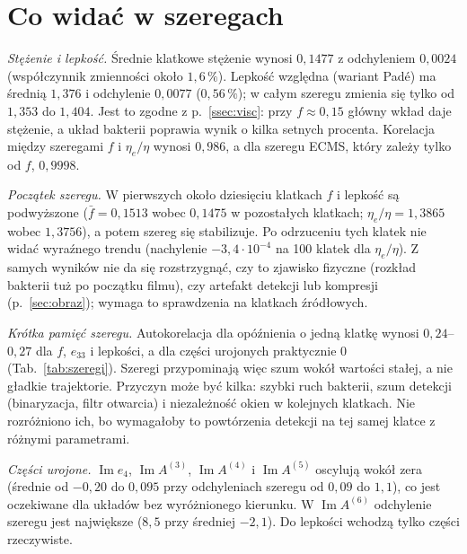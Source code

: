 \documentclass[12pt,a4paper,twoside,openright]{report}
\theoremstyle{definition}
\theoremstyle{remark}
\newcommand{\ziel}[1]{{\color{green!50!black}#1}}
\renewcommand{\Im}{\operatorname{Im}}
\begin{document}
\section{\ziel{Co widać w szeregach}}

\ziel{\emph{Stężenie i lepkość.} Średnie klatkowe stężenie wynosi $0{,}1477$ z odchyleniem $0{,}0024$ (współczynnik zmienności około $1{,}6\,\%$). Lepkość względna (wariant Padé) ma średnią $1{,}376$ i odchylenie $0{,}0077$ ($0{,}56\,\%$); w całym szeregu zmienia się tylko od $1{,}353$ do $1{,}404$. Jest to zgodne z p.~\ref{ssec:visc}: przy $f\approx0{,}15$ główny wkład daje stężenie, a układ bakterii poprawia wynik o kilka setnych procenta. Korelacja między szeregami $f$ i $\eta_e/\eta$ wynosi $0{,}986$, a dla szeregu ECMS, który zależy tylko od $f$, $0{,}9998$.}

\ziel{\emph{Początek szeregu.} W pierwszych około dziesięciu klatkach $f$ i lepkość są podwyższone ($\bar f=0{,}1513$ wobec $0{,}1475$ w pozostałych klatkach; $\eta_e/\eta=1{,}3865$ wobec $1{,}3756$), a potem szereg się stabilizuje. Po odrzuceniu tych klatek nie widać wyraźnego trendu (nachylenie $-3{,}4\cdot10^{-4}$ na 100 klatek dla $\eta_e/\eta$). Z samych wyników nie da się rozstrzygnąć, czy to zjawisko fizyczne (rozkład bakterii tuż po początku filmu), czy artefakt detekcji lub kompresji (p.~\ref{sec:obraz}); wymaga to sprawdzenia na klatkach źródłowych.}

\ziel{\emph{Krótka pamięć szeregu.} Autokorelacja dla opóźnienia o jedną klatkę wynosi $0{,}24$--$0{,}27$ dla $f$, $e_{33}$ i lepkości, a dla części urojonych praktycznie $0$ (Tab.~\ref{tab:szeregi}). Szeregi przypominają więc szum wokół wartości stałej, a nie gładkie trajektorie. Przyczyn może być kilka: szybki ruch bakterii, szum detekcji (binaryzacja, filtr otwarcia) i niezależność okien w kolejnych klatkach. Nie rozróżniono ich, bo wymagałoby to powtórzenia detekcji na tej samej klatce z różnymi parametrami.}

\ziel{\emph{Części urojone.} $\Im e_4$, $\Im A^{(3)}$, $\Im A^{(4)}$ i $\Im A^{(5)}$ oscylują wokół zera (średnie od $-0{,}20$ do $0{,}095$ przy odchyleniach szeregu od $0{,}09$ do $1{,}1$), co jest oczekiwane dla układów bez wyróżnionego kierunku. W $\Im A^{(6)}$ odchylenie szeregu jest największe ($8{,}5$ przy średniej $-2{,}1$). Do lepkości wchodzą tylko części rzeczywiste.}
\end{document}
